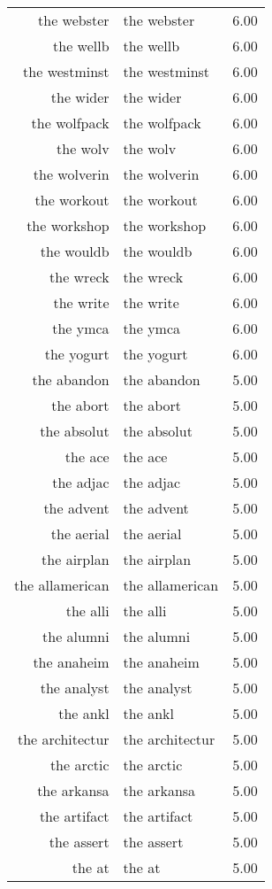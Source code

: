 \begin{table}[ht]
\begin{tabular}{rlr}
  the webster & the webster & 6.00 \\ 
  the wellb & the wellb & 6.00 \\ 
  the westminst & the westminst & 6.00 \\ 
  the wider & the wider & 6.00 \\ 
  the wolfpack & the wolfpack & 6.00 \\ 
  the wolv & the wolv & 6.00 \\ 
  the wolverin & the wolverin & 6.00 \\ 
  the workout & the workout & 6.00 \\ 
  the workshop & the workshop & 6.00 \\ 
  the wouldb & the wouldb & 6.00 \\ 
  the wreck & the wreck & 6.00 \\ 
  the write & the write & 6.00 \\ 
  the ymca & the ymca & 6.00 \\ 
  the yogurt & the yogurt & 6.00 \\ 
  the abandon & the abandon & 5.00 \\ 
  the abort & the abort & 5.00 \\ 
  the absolut & the absolut & 5.00 \\ 
  the ace & the ace & 5.00 \\ 
  the adjac & the adjac & 5.00 \\ 
  the advent & the advent & 5.00 \\ 
  the aerial & the aerial & 5.00 \\ 
  the airplan & the airplan & 5.00 \\ 
  the allamerican & the allamerican & 5.00 \\ 
  the alli & the alli & 5.00 \\ 
  the alumni & the alumni & 5.00 \\ 
  the anaheim & the anaheim & 5.00 \\ 
  the analyst & the analyst & 5.00 \\ 
  the ankl & the ankl & 5.00 \\ 
  the architectur & the architectur & 5.00 \\ 
  the arctic & the arctic & 5.00 \\ 
  the arkansa & the arkansa & 5.00 \\ 
  the artifact & the artifact & 5.00 \\ 
  the assert & the assert & 5.00 \\ 
  the at & the at & 5.00 \\ 

\end{tabular}
\end{table}
